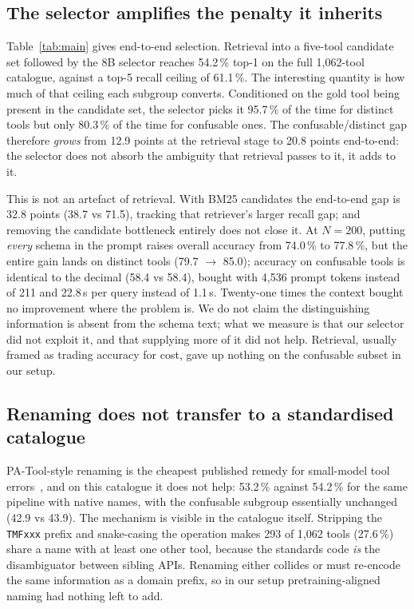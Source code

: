 \subsection{The selector amplifies the penalty it inherits}
Table~\ref{tab:main} gives end-to-end selection. Retrieval into a five-tool
candidate set followed by the 8B selector reaches 54.2\,\% top-1 on the full
1,062-tool catalogue, against a top-5 recall ceiling of 61.1\,\%. The
interesting quantity is how much of that ceiling each subgroup converts.
Conditioned on the gold tool being present in the candidate set, the selector
picks it 95.7\,\% of the time for distinct tools but only 80.3\,\% of the time
for confusable ones. The confusable/distinct gap therefore \emph{grows} from
12.9 points at the retrieval stage to 20.8 points end-to-end: the selector does
not absorb the ambiguity that retrieval passes to it, it adds to it.

This is not an artefact of retrieval. With BM25 candidates the end-to-end gap
is 32.8 points (38.7 vs 71.5), tracking that retriever's larger recall gap;
and removing the candidate bottleneck entirely does not close it. At $N=200$, putting \emph{every} schema in
the prompt raises overall accuracy from 74.0\,\% to 77.8\,\%, but the entire
gain lands on distinct tools (79.7 $\rightarrow$ 85.0); accuracy on confusable
tools is identical to the decimal (58.4 vs 58.4), bought with 4,536 prompt
tokens instead of 211 and 22.8\,s per query instead of 1.1\,s. Twenty-one times the context bought no improvement where the problem is.
We do not claim the distinguishing information is absent from the schema text;
what we measure is that our selector did not exploit it, and that supplying
more of it did not help. Retrieval, usually framed as trading accuracy for
cost, gave up nothing on the confusable subset in our setup.

\subsection{Renaming does not transfer to a standardised catalogue}
PA-Tool-style renaming is the cheapest published remedy for small-model tool
errors~\cite{patool}, and on this catalogue it does not help: 53.2\,\% against
54.2\,\% for the same pipeline with native names, with the confusable subgroup
essentially unchanged (42.9 vs 43.9). The mechanism is visible in the
catalogue itself. Stripping the \texttt{TMFxxx} prefix and snake-casing the
operation makes 293 of 1,062 tools (27.6\,\%) share a name with at least
one other tool, because the standards code \emph{is} the disambiguator between
sibling APIs. Renaming either collides or must re-encode the same information as a domain
prefix, so in our setup pretraining-aligned naming had nothing left to add.

